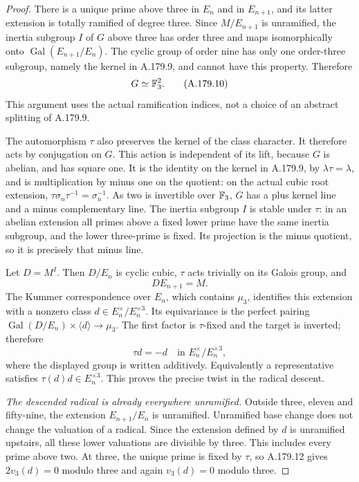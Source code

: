 \begin{proof}
There is a unique prime above three in \(E_n\) and in
\(E_{n+1}\), and its latter extension is totally ramified of
degree three.  Since \(M/E_{n+1}\) is unramified, the inertia
subgroup \(I\) of \(G\) above three has order three and maps
isomorphically onto \(\operatorname{Gal}(E_{n+1}/E_n)\).
The cyclic group of order nine has only one order-three subgroup,
namely the kernel in A.179.9, and cannot have this property.
Therefore
\[
                            G\simeq\mathbb F_3^2.
\tag{A.179.10}
\]
This argument uses the actual ramification indices, not a choice
of an abstract splitting of A.179.9.

The automorphism \(\tau\) also preserves the kernel of the class
character.  It therefore acts by conjugation on \(G\).
This action is independent of its lift, because \(G\) is abelian,
and has square one.  It is the identity on the kernel in A.179.9,
by \(\lambda\tau=\lambda\), and is multiplication by minus one
on the quotient: on the actual cubic root extension,
\(\tau\sigma_n\tau^{-1}=\sigma_n^{-1}\).
As two is invertible over \(\mathbb F_3\), \(G\) has a plus kernel line
and a minus complementary line.  The inertia subgroup \(I\) is
stable under \(\tau\): in an abelian extension all primes above
a fixed lower prime have the same inertia subgroup, and the lower
three-prime is fixed.  Its projection is the minus quotient, so
it is precisely that minus line.

Let \(D=M^I\).  Then \(D/E_n\) is cyclic cubic, \(\tau\) acts
trivially on its Galois group, and
\[
                             D E_{n+1}=M.
\tag{A.179.11}
\]
The Kummer correspondence over \(E_n\), which contains \(\mu_3\),
identifies this extension with a nonzero class
\(d\in E_n^\times/E_n^{\times3}\).
Its equivariance is the perfect pairing
\(\operatorname{Gal}(D/E_n)\times\langle d\rangle\to\mu_3\).
The first factor is \(\tau\)-fixed and the target is inverted;
therefore
\[
                               \tau d=-d
                 \quad\text{in }E_n^\times/E_n^{\times3},
\tag{A.179.12}
\]
where the displayed group is written additively.  Equivalently a
representative satisfies \(\tau(d)d\in E_n^{\times3}\).
This proves the precise twist in the radical descent.

\emph{The descended radical is already everywhere unramified.}
Outside three, eleven and fifty-nine, the extension
\(E_{n+1}/E_n\) is unramified.  Unramified base change does not
change the valuation of a radical.  Since the extension defined
by \(d\) is unramified upstairs, all these lower valuations are
divisible by three.  This includes every prime above two.
At three, the unique prime is fixed by \(\tau\), so A.179.12
gives \(2v_3(d)=0\) modulo three and again
\(v_3(d)=0\) modulo three.


\end{proof}
